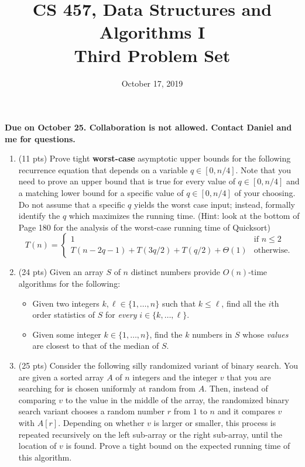 \documentclass{article}
\begin{document}
\title{CS 457, Data Structures and Algorithms I\\
Third Problem Set}
\date{October 17, 2019}
\maketitle
\begin{center}
\textbf{Due on October 25. Collaboration is not allowed. Contact Daniel and me for questions.}
\end{center}
\begin{enumerate}


\item (11 pts) Prove tight \textbf{worst-case} asymptotic upper bounds for the following recurrence equation 
that depends on a variable $q\in [0, n/4]$. Note that you need to prove an upper bound that is true for every 
value of $q\in [0, n/4]$ and a matching lower bound for a specific value of $q\in [0, n/4]$ of your choosing. 
Do not assume that a specific $q$ yields the worst case input; instead, formally identify the $q$ which maximizes 
the running time. (Hint: look at the bottom of Page 180 for the analysis of the worst-case running time of Quicksort)
\begin{equation*}
T(n) =
\begin{cases}
1 &\text{if $n\leq 2$}\\
T(n-2q-1)+T(3q/2)+T(q/2)+\Theta(1) &\text{otherwise.}
\end{cases}
\end{equation*}


\item (24 pts) Given an array $S$ of $n$ distinct numbers provide $O(n)$-time algorithms for the following:
\begin{itemize}
\item Given two integers $k,\ell \in \{1,\dots, n\}$ such that $k\leq \ell$, find all the $i$th order statistics of $S$ for \emph{every} 
$i\in \{k, \dots, \ell\}$.

\item Given some integer $k\in \{1,\dots, n\}$, find the $k$ numbers in $S$ whose \emph{values} are closest to that of the median of $S$.
\end{itemize}



\item (25 pts) Consider the following silly randomized variant of binary search. You are given 
a sorted array $A$ of $n$ integers and the integer $v$ that you are searching for is chosen uniformly 
at random from $A$. Then, instead of comparing $v$ to the value in the middle
of the array, the randomized binary search variant chooses a random number $r$ from $1$ to $n$ and
it compares $v$ with $A[r]$. Depending on whether $v$ is larger or smaller, this process is
repeated recursively on the left sub-array or the right sub-array, until the location of $v$ is
found. Prove a tight bound on the expected running time of this algorithm.


\end{enumerate}
\end{document}
